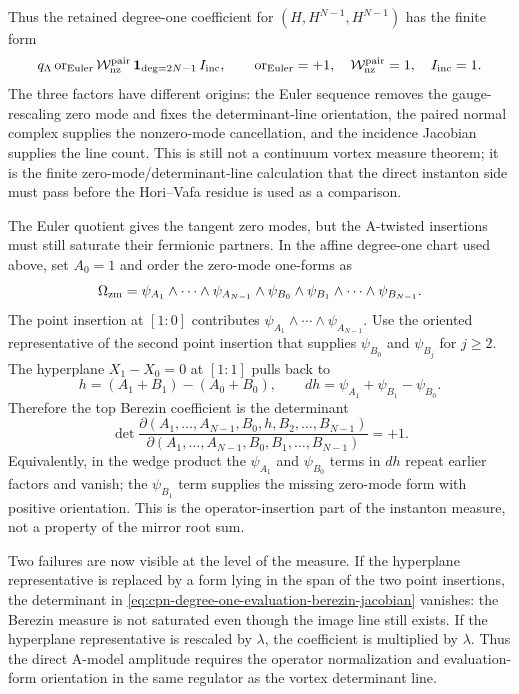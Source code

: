 \begin{example}
Thus the retained degree-one coefficient for
\((H,H^{N-1},H^{N-1})\) has the finite form
\[
  q_\Lambda\,
  {\rm or}_{\rm Euler}\,
  {\mathcal W}^{\rm pair}_{\rm nz}\,
  {\bf 1}_{\deg=2N-1}\,
  I_{\rm inc},
  \qquad
  {\rm or}_{\rm Euler}=+1,\quad
  {\mathcal W}^{\rm pair}_{\rm nz}=1,\quad
  I_{\rm inc}=1 .
\]
The three factors have different origins: the Euler sequence removes the
gauge-rescaling zero mode and fixes the determinant-line orientation, the
paired normal complex supplies the nonzero-mode cancellation, and the incidence
Jacobian supplies the line count.  This is still not a continuum vortex
measure theorem; it is the finite zero-mode/determinant-line calculation that
the direct instanton side must pass before the Hori--Vafa residue is used as a
comparison.
\end{example}

\begin{example}
\label{ex:cpn-degree-one-evaluation-berezin-jacobian}
The Euler quotient gives the tangent zero modes, but the A-twisted insertions
must still saturate their fermionic partners.  In the affine degree-one chart
used above, set \(A_0=1\) and order the zero-mode one-forms as
\[
  \Omega_{\rm zm}
  =
  \psi_{A_1}\wedge\cdots\wedge\psi_{A_{N-1}}
  \wedge\psi_{B_0}\wedge\psi_{B_1}
  \wedge\cdots\wedge\psi_{B_{N-1}} .
\]
The point insertion at \([1:0]\) contributes
\(\psi_{A_1}\wedge\cdots\wedge\psi_{A_{N-1}}\).  Use the oriented
representative of the second point insertion that supplies
\(\psi_{B_0}\) and \(\psi_{B_j}\) for \(j\ge2\).  The hyperplane
\(X_1-X_0=0\) at \([1:1]\) pulls back to
\[
  h=(A_1+B_1)-(A_0+B_0),
  \qquad
  dh=\psi_{A_1}+\psi_{B_1}-\psi_{B_0}.
\]
Therefore the top Berezin coefficient is the determinant
\begin{equation}
  \det
  \frac{\partial(A_1,\ldots,A_{N-1},B_0,h,B_2,\ldots,B_{N-1})}
       {\partial(A_1,\ldots,A_{N-1},B_0,B_1,\ldots,B_{N-1})}
  =
  +1 .
  \label{eq:cpn-degree-one-evaluation-berezin-jacobian}
\end{equation}
Equivalently, in the wedge product the \(\psi_{A_1}\) and
\(\psi_{B_0}\) terms in \(dh\) repeat earlier factors and vanish; the
\(\psi_{B_1}\) term supplies the missing zero-mode form with positive
orientation.  This is the operator-insertion part of the instanton measure,
not a property of the mirror root sum.

Two failures are now visible at the level of the measure.  If the hyperplane
representative is replaced by a form lying in the span of the two point
insertions, the determinant in
\eqref{eq:cpn-degree-one-evaluation-berezin-jacobian} vanishes: the Berezin
measure is not saturated even though the image line still exists.  If the
hyperplane representative is rescaled by \(\lambda\), the coefficient is
multiplied by \(\lambda\).  Thus the direct A-model amplitude requires the
operator normalization and evaluation-form orientation in the same regulator as
the vortex determinant line.
\end{example}

